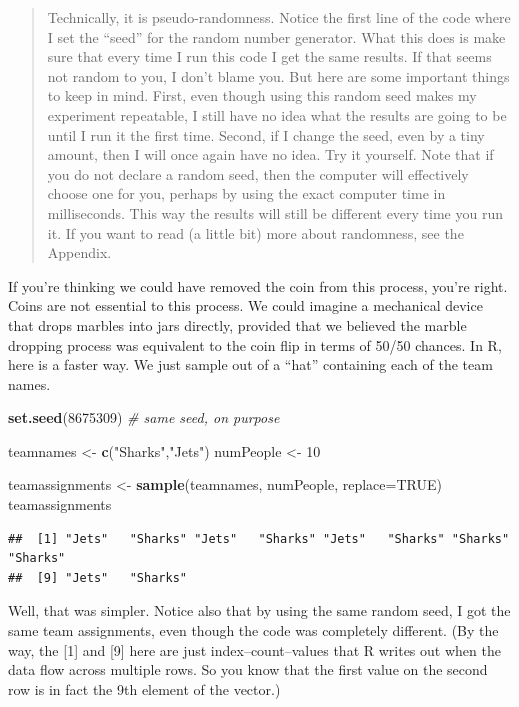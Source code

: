 \documentclass[openany]{book}
\newenvironment{Shaded}{\begin{snugshade}}{\end{snugshade}}
\newcommand{\CommentTok}[1]{\textcolor[rgb]{0.56,0.35,0.01}{\textit{#1}}}
\newcommand{\DataTypeTok}[1]{\textcolor[rgb]{0.13,0.29,0.53}{#1}}
\newcommand{\DecValTok}[1]{\textcolor[rgb]{0.00,0.00,0.81}{#1}}
\newcommand{\KeywordTok}[1]{\textcolor[rgb]{0.13,0.29,0.53}{\textbf{#1}}}
\newcommand{\NormalTok}[1]{#1}
\newcommand{\OtherTok}[1]{\textcolor[rgb]{0.56,0.35,0.01}{#1}}
\newcommand{\StringTok}[1]{\textcolor[rgb]{0.31,0.60,0.02}{#1}}
\begin{document}
\begin{quote}
Technically, it is pseudo-randomness. Notice the first line of the code where I set the ``seed'' for the random number generator. What this does is make sure that every time I run this code I get the same results. If that seems not random to you, I don't blame you. But here are some important things to keep in mind. First, even though using this random seed makes my experiment repeatable, I still have no idea what the results are going to be until I run it the first time. Second, if I change the seed, even by a tiny amount, then I will once again have no idea. Try it yourself. Note that if you do not declare a random seed, then the computer will effectively choose one for you, perhaps by using the exact computer time in milliseconds. This way the results will still be different every time you run it. If you want to read (a little bit) more about randomness, see the Appendix.
\end{quote}

If you're thinking we could have removed the coin from this process, you're right. Coins are not essential to this process. We could imagine a mechanical device that drops marbles into jars directly, provided that we believed the marble dropping process was equivalent to the coin flip in terms of 50/50 chances. In R, here is a faster way. We just sample out of a ``hat'' containing each of the team names.

\begin{Shaded}
\begin{Highlighting}[]
\KeywordTok{set.seed}\NormalTok{(}\DecValTok{8675309}\NormalTok{) }\CommentTok{# same seed, on purpose}

\NormalTok{teamnames <-}\StringTok{ }\KeywordTok{c}\NormalTok{(}\StringTok{"Sharks"}\NormalTok{,}\StringTok{"Jets"}\NormalTok{)}
\NormalTok{numPeople <-}\StringTok{ }\DecValTok{10}

\NormalTok{teamassignments <-}\StringTok{ }\KeywordTok{sample}\NormalTok{(teamnames, numPeople, }\DataTypeTok{replace=}\OtherTok{TRUE}\NormalTok{)}
\NormalTok{teamassignments}
\end{Highlighting}
\end{Shaded}

\begin{verbatim}
##  [1] "Jets"   "Sharks" "Jets"   "Sharks" "Jets"   "Sharks" "Sharks" "Sharks"
##  [9] "Jets"   "Sharks"
\end{verbatim}

Well, that was simpler. Notice also that by using the same random seed, I got the same team assignments, even though the code was completely different. (By the way, the {[}1{]} and {[}9{]} here are just index--count--values that R writes out when the data flow across multiple rows. So you know that the first value on the second row is in fact the 9th element of the vector.)
\end{document}
